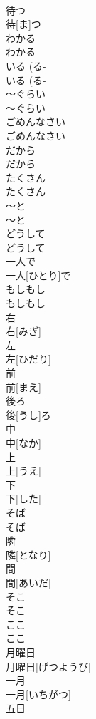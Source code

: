 \documentclass[8pt]{extreport}
\begin{document}
\begin{CJK}{UTF8}{min}
\\	待つ	
\\	待[ま]つ
\\	わかる	
\\	わかる
\\	いる (る-
\\	いる (る-
\\	〜ぐらい	
\\	〜ぐらい
\\	ごめんなさい	
\\	ごめんなさい
\\	だから	
\\	だから
\\	たくさん	
\\	たくさん
\\	〜と	
\\	〜と
\\	どうして	
\\	どうして
\\	一人で	
\\	一人[ひとり]で
\\	もしもし	
\\	もしもし
\\	右	
\\	右[みぎ]
\\	左	
\\	左[ひだり]
\\	前	
\\	前[まえ]
\\	後ろ	
\\	後[うし]ろ
\\	中	
\\	中[なか]
\\	上	
\\	上[うえ]
\\	下	
\\	下[した]
\\	そば	
\\	そば
\\	隣	
\\	隣[となり]
\\	間	
\\	間[あいだ]
\\	そこ	
\\	そこ
\\	ここ	
\\	ここ
\\	月曜日	
\\	月曜日[げつようび]
\\	一月	
\\	一月[いちがつ]
\\	五日	

\end{CJK}
\end{document}
